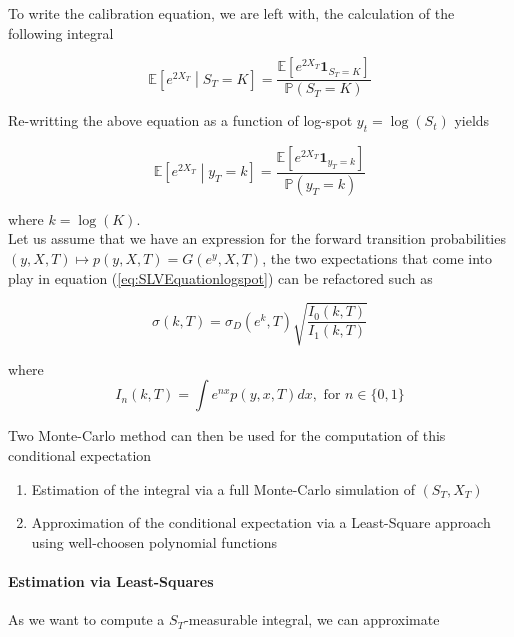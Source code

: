 \documentclass{article}
\begin{document}
\noindent To write the calibration equation, we are left with, the calculation of the following integral

\begin{equation}
	\mathbb{E}\left[e^{2X_T}\middle| S_T=K\right] = \frac{\mathbb{E}\left[e^{2X_T} \textbf{1}_{S_T=K}\right]}{\mathbb{P}(S_T = K)}
\end{equation}

\noindent Re-writting the above equation as a function of log-spot $y_t = \log\left(S_t\right)$ yields

\begin{equation}
	\label{eq:SLVEquationlogspot}
	\mathbb{E}\left[e^{2X_T}\middle| y_T=k\right] = \frac{\mathbb{E}\left[e^{2X_T} \textbf{1}_{y_T=k}\right]}{\mathbb{P}(y_T = k)}
\end{equation}

\noindent where $k = \log(K)$.\\

\noindent Let us assume that we have an expression for the forward transition probabilities $(y,X,T) \mapsto p(y,X,T) = G(e^y,X,T)$, the two expectations that come into play in equation (\ref{eq:SLVEquationlogspot}) can be refactored such as

\begin{equation}
	\sigma(k,T) = \sigma_D(e^k, T) \sqrt{\frac{I_0(k,T)}{I_1(k,T)}}
\end{equation}

\noindent where
\begin{equation}
	I_n(k,T) = \int e^{nx} p(y,x,T) dx, \text{ for } n \in \{0,1\}
\end{equation}

\noindent Two Monte-Carlo method can then be used for the computation of this conditional expectation

\begin{enumerate}
	\item Estimation of the integral via a full Monte-Carlo simulation of $(S_T,X_T)$
	\item Approximation of the conditional expectation via a Least-Square approach using well-choosen polynomial functions
\end{enumerate}

\paragraph{Estimation via Least-Squares}
As we want to compute a $S_T$-measurable integral, we can approximate
\end{document}

